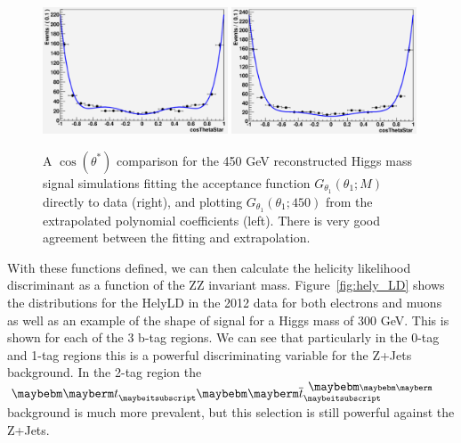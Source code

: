 \begin{figure}[htb!]
\begin{center}
\centerline{
\includegraphics[width=0.49\textwidth]{Optimization/costhetast_450_fit.pdf}
\includegraphics[width=0.49\textwidth]{Optimization/costhetast_450_extrap.pdf}
}
\caption{A $\cos(\theta^*)$ comparison for the 450 GeV reconstructed Higgs mass signal simulations fitting the  acceptance function $G_{\theta_1}(\theta_1;M)$ directly to data (right), and plotting $G_{\theta_1}(\theta_1;450)$ from the extrapolated polynomial coefficients (left). There is very good agreement between the fitting and extrapolation.  
}
\label{fig:fit_param}
\end{center}
\end{figure}

With these functions defined, we can then calculate the helicity likelihood discriminant as a function of the ZZ invariant mass.  Figure~\ref{fig:hely_LD} shows the distributions for the HelyLD in the 2012 data for both electrons and muons as well as an example of the shape of signal for a Higgs mass of 300 GeV.  This is shown for each of the 3 b-tag regions.  We can see that particularly in the 0-tag and 1-tag regions this is a powerful discriminating variable for the Z+Jets background.  In the 2-tag region the $\Pqt \Paqt$ background is much more prevalent, but this selection is still powerful against the Z+Jets.  


